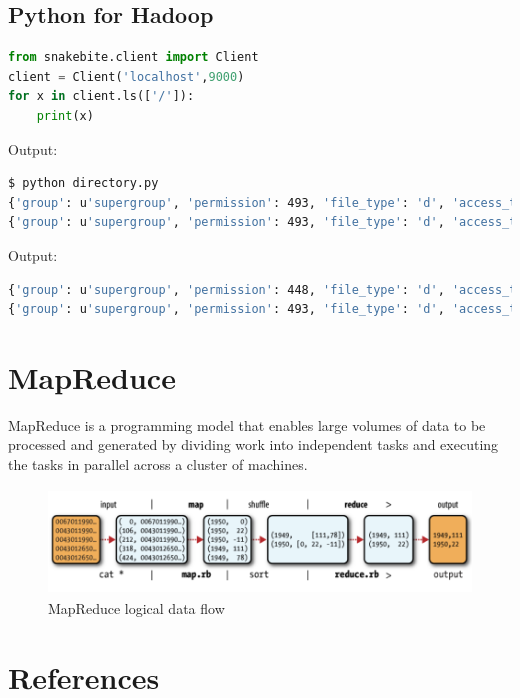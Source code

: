 \documentclass[pdf]{beamer}
\begin{document}
\subsection{Python for Hadoop}
\begin{frame}[fragile]{}
\begin{lstlisting}[language=python]
from snakebite.client import Client
client = Client('localhost',9000)
for x in client.ls(['/']):
    print(x)
\end{lstlisting}

\end{frame}


\begin{frame}[fragile]{}
Output:
\begin{lstlisting}[language=bash]
$ python directory.py
{'group': u'supergroup', 'permission': 493, 'file_type': 'd', 'access_time': 0L, 'block_replication': 0, 'modification_time': 1577555408630L, 'length': 0L, 'blocksize': 0L, 'owner': u'hadoop', 'path': '/input'}
{'group': u'supergroup', 'permission': 493, 'file_type': 'd', 'access_time': 0L, 'block_replication': 0, 'modification_time': 1577558938592L, 'length': 0L, 'blocksize': 0L, 'owner': u'hadoop', 'path': '/output'}

\end{lstlisting}
\end{frame}


\begin{frame}[fragile]{}
Output:
\begin{lstlisting}[language=bash]
{'group': u'supergroup', 'permission': 448, 'file_type': 'd', 'access_time': 0L, 'block_replication': 0, 'modification_time': 1576688626857L, 'length': 0L, 'blocksize': 0L, 'owner': u'hadoop', 'path': '/tmp'}
{'group': u'supergroup', 'permission': 493, 'file_type': 'd', 'access_time': 0L, 'block_replication': 0, 'modification_time': 1578027777363L, 'length': 0L, 'blocksize': 0L, 'owner': u'hadoop', 'path': '/user'}
\end{lstlisting}
\end{frame}


\section{MapReduce}
\begin{frame}[fragile]{}
MapReduce is a programming model that enables large volumes of data to be processed and generated by dividing work into independent tasks and executing the tasks in parallel across a cluster of machines.

\begin{figure}[ht]
	    \begin{center}
        		\includegraphics[height=1.1in]{13.png}
    \end{center}
    \caption{MapReduce logical data flow\cite{hdg}}
    \end{figure}
\end{frame}


\section{References}
 

\end{document}

